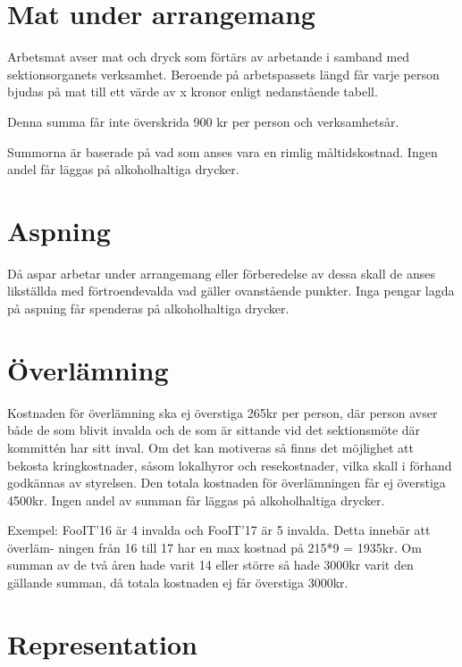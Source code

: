 \documentclass[11pt, includeaddress]{classes/cthit}
\begin{document}
\section{Mat under arrangemang}
Arbetsmat avser mat och dryck som förtärs av arbetande i samband med sektionsorganets verksamhet. 
Beroende på arbetspassets längd får varje person bjudas på mat till ett värde av x kronor enligt nedanstående tabell.

\addvbuffer[\the\baselineskip]{\begin{tabular}{ l  c  c  c}
	\centering
	Timmar & [0-3] & (3-6] & (6-$\infty$) \\
	\hline
	Kronor & 0 & 75 & 150 \\
\end{tabular}}

    Denna summa får inte överskrida 900 kr per person och verksamhetsår.

    Summorna är baserade på vad som anses vara en rimlig
    måltidskostnad. Ingen andel får läggas på alkoholhaltiga drycker.

\section{Aspning}
Då aspar arbetar under arrangemang eller förberedelse av dessa skall de anses likställda med förtroendevalda vad gäller ovanstående punkter. Inga pengar lagda på aspning får spenderas på alkoholhaltiga drycker.

\section{Överlämning}
Kostnaden för överlämning ska ej överstiga 265kr per person, där person avser både de som blivit invalda och de som är sittande vid det sektionsmöte där kommittén har sitt inval. Om det kan motiveras så finns det möjlighet att bekosta kringkostnader, såsom lokalhyror och resekostnader, vilka skall i förhand godkännas av styrelsen. Den totala kostnaden för överlämningen får ej överstiga 4500kr. Ingen andel av summan får läggas på alkoholhaltiga drycker.

Exempel: FooIT’16 är 4 invalda och FooIT’17 är 5 invalda. Detta innebär att överläm- ningen från 16 till 17 har en max kostnad på 215*9 = 1935kr. Om summan av de två åren hade varit 14 eller större så hade 3000kr varit den gällande summan, då totala kostnaden ej får överstiga 3000kr.

\section{Representation}
\end{document}
